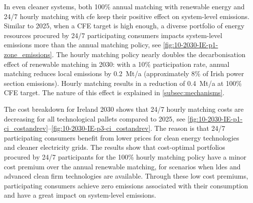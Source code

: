 In even cleaner systems, both 100\% annual matching with renewable energy and 24/7 hourly matching with \gls{cfe} keep their positive effect on system-level emissions.
Similar to 2025, when a CFE target is high enough, a diverse portfolio of energy resources procured by 24/7 participating consumers impacts system-level emissions more than the annual matching policy, see \cref{fig:10-2030-IE-p1-zone_emissions}.
The hourly matching policy nearly doubles the decarbonisation effect of renewable matching in 2030: with a 10\% participation rate, annual matching reduces local emissions by 0.2~Mt\co/a (approximately 8\% of Irish power section emissions). 
Hourly matching results in a reduction of 0.4~Mt\co/a at 100\% CFE target.
The nature of this effect is explained in \cref{subsec:mechanisms}.

The cost breakdown for Ireland 2030 shows that 24/7 hourly matching costs are decreasing for all technological pallets compared to 2025, see \cref{fig:10-2030-IE-p1-ci_costandrev}--\cref{fig:10-2030-IE-p3-ci_costandrev}.
The reason is that 24/7 participating consumers benefit from lower prices for clean energy technologies and cleaner electricity grids. 
The results show that cost-optimal portfolios procured by 24/7 participants for the 100\% hourly matching policy have a minor cost premium over the annual renewable matching, for scenarios when \gls{ldes} and advanced clean firm technologies are available. 
Through these low cost premiums, participating consumers achieve zero emissions associated with their consumption and have a great impact on system-level \co emissions.


